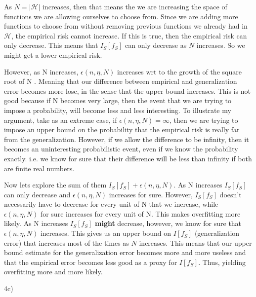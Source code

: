 \documentclass[12pt]{report}
\begin{document}
As $N = |\mathcal{H}|$ increases, then that means the we are increasing the space of functions we are allowing ourselves to choose from. Since we are adding more functions to choose from without removing previous functions we already had in $\mathcal{H}$, the empirical risk cannot increase. If this is true, then the empirical risk can only decrease. This means that $I_S[f_S]$ can only decrease as $N$ increases. So we might get a lower empirical risk. 

However, as N increases, $\epsilon(n, \eta, N)$ increases wrt to the growth of  the square root of N . Meaning that our difference between empirical and generalization error becomes more lose, in the sense that the upper bound increases. This is not good because if N becomes very large, then the event that we are trying to impose a probability, will become less and less interesting. To illustrate my argument, take as an extreme case, if $\epsilon(n, \eta, N) = \infty$, then we are trying to impose an upper bound on the probability that the empirical risk is really far from the generalization. However, if we allow the difference to be infinity, then it becomes an uninteresting probabilistic event, even if we know the probability exactly. i.e. we know for sure that their difference will be less than infinity if both are finite real numbers.

Now lets explore the sum of them $I_S[f_S] + \epsilon(n, \eta, N)$. As N increases $I_S[f_S]$ can only decrease and $\epsilon(n, \eta, N)$ increases for sure. However, $I_S[f_S]$ doesn't necessarily have to decrease for every unit of N that we increase, while $\epsilon(n, \eta, N)$ for sure increases for every unit of N. This makes overfitting more likely. As N increases $I_S[f_S]$ \textbf{might} decrease, however, we know for sure that $\epsilon(n, \eta, N)$ increases. This gives us an upper bound on $I[f_S]$ (generalization error) that increases most of the times as $N$ increases. This means that our upper bound estimate for the generalization error becomes more and more useless and that the empirical error becomes less good as a proxy for $I[f_S]$. Thus, yielding overfitting more and more likely.

4c)
\end{document}
